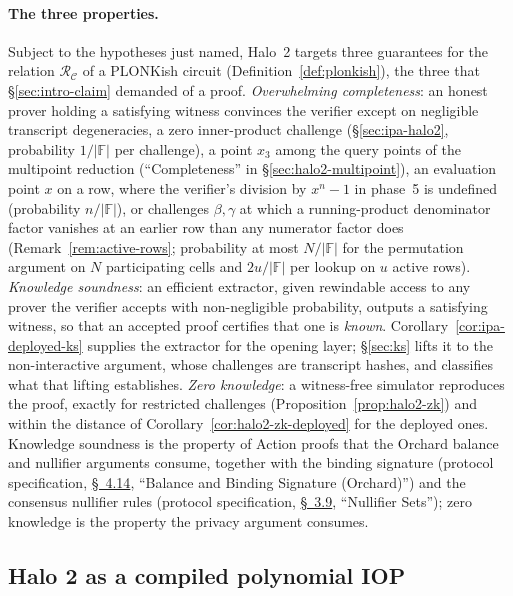 \documentclass[11pt,a4paper]{article}
\theoremstyle{definition}
\newcommand{\F}{\mathbb{F}}
\newcommand{\Rel}{\mathcal{R}}
\begin{document}
\paragraph{The three properties.}
Subject to the hypotheses just named, Halo~2 targets three guarantees
for the relation $\Rel_{\mathcal C}$ of a PLONKish circuit
(Definition~\ref{def:plonkish}), the three that
\S\ref{sec:intro-claim} demanded of a proof. \emph{Overwhelming
completeness}: an honest prover holding a satisfying witness convinces
the verifier except on negligible transcript degeneracies, a zero
inner-product challenge (\S\ref{sec:ipa-halo2}, probability $1/|\F|$ per
challenge), a point $x_3$ among the query points of the multipoint
reduction (``Completeness'' in \S\ref{sec:halo2-multipoint}), an
evaluation point $x$ on a row, where the verifier's division by
$x^{n} - 1$ in phase~5 is undefined (probability $n/|\F|$), or challenges
$\beta, \gamma$ at which a running-product denominator factor vanishes
at an earlier row than any numerator factor does
(Remark~\ref{rem:active-rows}; probability at most $N/|\F|$ for the
permutation argument on $N$ participating cells and $2u/|\F|$ per lookup
on $u$ active rows).
\emph{Knowledge soundness}: an efficient extractor, given rewindable
access to any prover the verifier accepts with non-negligible
probability, outputs a satisfying witness, so that an accepted proof
certifies that one is \emph{known}. Corollary~\ref{cor:ipa-deployed-ks}
supplies the extractor for the opening layer; \S\ref{sec:ks} lifts it to
the non-interactive argument, whose challenges are transcript hashes,
and classifies what that lifting establishes.
\emph{Zero knowledge}: a witness-free simulator reproduces the proof,
exactly for restricted challenges (Proposition~\ref{prop:halo2-zk}) and
within the distance of Corollary~\ref{cor:halo2-zk-deployed} for the
deployed ones. Knowledge soundness is the property of Action proofs that
the Orchard balance and nullifier arguments consume, together with the
binding signature (protocol specification,
\href{https://zips.z.cash/protocol/protocol.pdf\#orchardbalance}{\S~4.14},
``Balance and Binding Signature (Orchard)'') and the consensus nullifier
rules (protocol specification,
\href{https://zips.z.cash/protocol/protocol.pdf\#nullifierset}{\S~3.9},
``Nullifier Sets''); zero knowledge is the property the privacy
argument consumes.

\subsection{Halo 2 as a compiled polynomial IOP}
\label{sec:halo2-piop}
\end{document}
